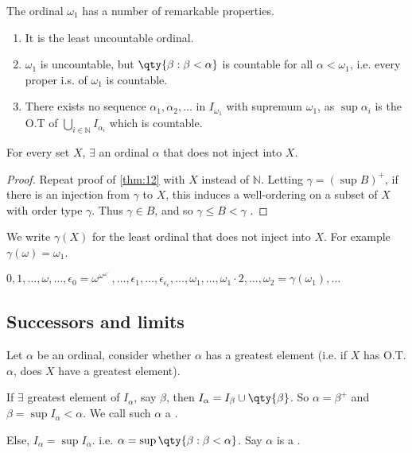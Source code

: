 The ordinal $\omega_1$ has a number of remarkable properties.
\begin{enumerate}
    \item It is the least uncountable ordinal.
    \item $\omega_1$ is uncountable, but $\qty{\beta : \beta < \alpha}$ is countable for all $\alpha < \omega_1$, i.e. every proper i.s. of $\omega_1$ is countable.
    \item There exists no sequence $\alpha_1, \alpha_2, \dots$ in $I_{\omega_1}$ with supremum $\omega_1$, as $\sup{\alpha_i}$ is the O.T of $\bigcup_{i \in \mathbb{N}} I_{\alpha_i}$ which is countable.
\end{enumerate}

\begin{theorem}
    For every set $X$, $\exists$ an ordinal $\alpha$ that does not inject into $X$.
\end{theorem}

\begin{proof}
    Repeat proof of \cref{thm:12} with $X$ instead of $\mathbb{N}$.
    Letting $\gamma = (\sup B)^+$, if there is an injection from $\gamma$ to $X$, this induces a well-ordering on a subset of $X$ with order type $\gamma$.
    Thus $\gamma \in B$, and so $\gamma \leq B < \gamma$ \Lightning.
\end{proof}

\begin{remark}
    We write $\gamma(X)$ for the least ordinal that does not inject into $X$.
    For example $\gamma(\omega) = \omega_1$.

    $0, 1, \dots, \omega, \dots, \epsilon_0 = \omega^{\omega^{\omega^{\dots}}}, \dots, \epsilon_1, \dots, \epsilon_{\epsilon_{\epsilon}}, \dots, \omega_1, \dots, \omega_1 \cdot 2, \dots, \omega_2 = \gamma(\omega_1), \dots$
\end{remark}

\subsection{Successors and limits}

Let $\alpha$ be an ordinal, consider whether $\alpha$ has a greatest element (i.e. if $X$ has O.T. $\alpha$, does $X$ have a greatest element).
\begin{definition}[Successor]
    If $\exists$ greatest element of $I_\alpha$, say $\beta$, then $I_\alpha = I_\beta \cup \qty{\beta}$.
    So $\alpha = \beta^+$ and $\beta = \sup I_{\alpha} < \alpha$.
    We call such $\alpha$ a .

    Else, $I_\alpha = \sup I_\alpha$. i.e. $\alpha = \sup \qty{\beta : \beta < \alpha}$.
    Say $\alpha$ is a .
\end{definition}

